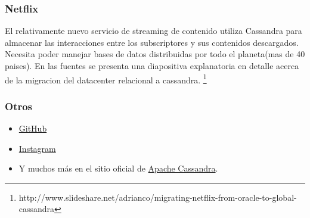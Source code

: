 \documentclass[11pt,a4paper]{article}
\begin{document}
\subsubsection{Netflix}
El relativamente nuevo servicio de streaming de contenido utiliza Cassandra para almacenar las interacciones entre los subscriptores y sus contenidos descargados. Necesita poder manejar bases de datos distribuidas por todo el planeta(mas de 40 paises). En las fuentes se presenta una diapositiva explanatoria en detalle acerca de la migracion del datacenter relacional a cassandra.
\footnote{http://www.slideshare.net/adrianco/migrating-netflix-from-oracle-to-global-cassandra}

\subsubsection{Otros}

\begin{itemize}
  \item \href{http://live-pc-development.pantheon.io/blog/analytics-at-github-with-apache-cassandra/}{GitHub}
  \item \href{http://www.planetcassandra.org/blog/interview/facebooks-instagram-making-the-switch-to-cassandra-from-redis-a-75-insta-savings/}{Instagram}
  \item Y muchos más en el sitio oficial de \href{http://cassandra.apache.org/}{Apache Cassandra}.
\end{itemize}
\end{document}
